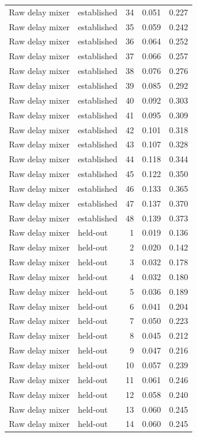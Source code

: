 \begin{tabular}{llrrr}
Raw delay mixer & established & 34 & 0.051 & 0.227 \\
Raw delay mixer & established & 35 & 0.059 & 0.242 \\
Raw delay mixer & established & 36 & 0.064 & 0.252 \\
Raw delay mixer & established & 37 & 0.066 & 0.257 \\
Raw delay mixer & established & 38 & 0.076 & 0.276 \\
Raw delay mixer & established & 39 & 0.085 & 0.292 \\
Raw delay mixer & established & 40 & 0.092 & 0.303 \\
Raw delay mixer & established & 41 & 0.095 & 0.309 \\
Raw delay mixer & established & 42 & 0.101 & 0.318 \\
Raw delay mixer & established & 43 & 0.107 & 0.328 \\
Raw delay mixer & established & 44 & 0.118 & 0.344 \\
Raw delay mixer & established & 45 & 0.122 & 0.350 \\
Raw delay mixer & established & 46 & 0.133 & 0.365 \\
Raw delay mixer & established & 47 & 0.137 & 0.370 \\
Raw delay mixer & established & 48 & 0.139 & 0.373 \\
Raw delay mixer & held-out & 1 & 0.019 & 0.136 \\
Raw delay mixer & held-out & 2 & 0.020 & 0.142 \\
Raw delay mixer & held-out & 3 & 0.032 & 0.178 \\
Raw delay mixer & held-out & 4 & 0.032 & 0.180 \\
Raw delay mixer & held-out & 5 & 0.036 & 0.189 \\
Raw delay mixer & held-out & 6 & 0.041 & 0.204 \\
Raw delay mixer & held-out & 7 & 0.050 & 0.223 \\
Raw delay mixer & held-out & 8 & 0.045 & 0.212 \\
Raw delay mixer & held-out & 9 & 0.047 & 0.216 \\
Raw delay mixer & held-out & 10 & 0.057 & 0.239 \\
Raw delay mixer & held-out & 11 & 0.061 & 0.246 \\
Raw delay mixer & held-out & 12 & 0.058 & 0.240 \\
Raw delay mixer & held-out & 13 & 0.060 & 0.245 \\
Raw delay mixer & held-out & 14 & 0.060 & 0.245 \\

\end{tabular}
